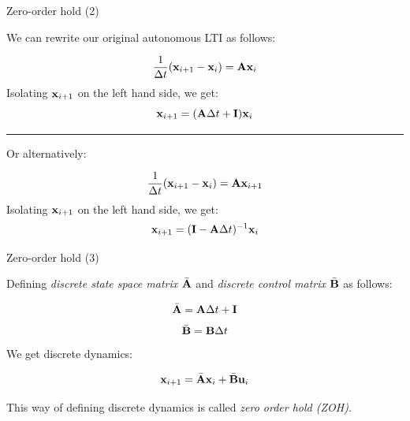 \documentclass{beamer}
\begin{document}
\begin{frame}{Zero-order hold (2)}
\begin{flushleft}

We can rewrite our original autonomous LTI as follows:

\begin{equation}
\frac{1}{\Delta t}(\mathbf{x}_{i + 1} - \mathbf{x}_i) = \mathbf{A} \mathbf{x}_i
\end{equation}
Isolating $\mathbf{x}_{i + 1}$ on the left hand side, we get:
\begin{equation}
\mathbf{x}_{i + 1} = (\mathbf{A} \Delta t + \mathbf{I}) \mathbf{x}_i
\end{equation}

\noindent\rule{11cm}{0.4pt}

Or alternatively:

\begin{equation}
\frac{1}{\Delta t}(\mathbf{x}_{i + 1} - \mathbf{x}_i) = \mathbf{A} \mathbf{x}_{i + 1}
\end{equation}
Isolating $\mathbf{x}_{i + 1}$ on the left hand side, we get:
\begin{equation}
\mathbf{x}_{i + 1} = (\mathbf{I} - \mathbf{A} \Delta t)^{-1} \mathbf{x}_i 
\end{equation}

\end{flushleft}
\end{frame}




\begin{frame}{Zero-order hold (3)}
\begin{flushleft}

Defining \emph{discrete state space matrix} $\bar{\mathbf{A}}$ and \emph{discrete control matrix} $\bar{\mathbf{B}}$ as follows:

\begin{equation}
\bar{\mathbf{A}} = \mathbf{A} \Delta t + \mathbf{I}
\end{equation}
\begin{equation}
\bar{\mathbf{B}} = \mathbf{B} \Delta t
\end{equation}
%
We get discrete dynamics:

\begin{equation}
\mathbf{x}_{i+1} = \bar{\mathbf{A}} \mathbf{x}_i + \bar{\mathbf{B}} \mathbf u_i
\end{equation}

This way of defining discrete dynamics is called \emph{zero order hold (ZOH)}.

\end{flushleft}
\end{frame}
\end{document}
